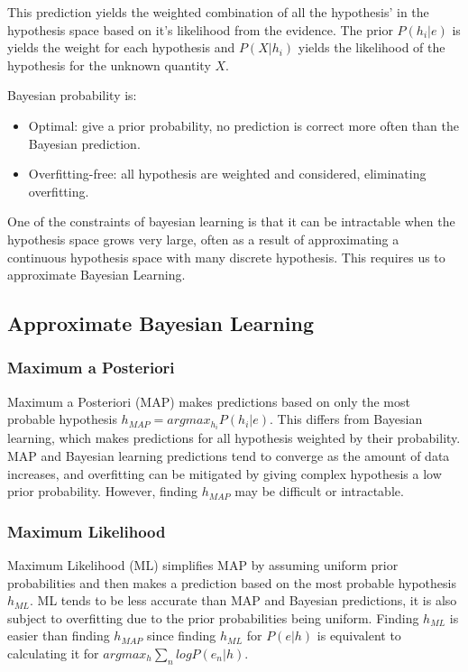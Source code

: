 \documentclass[12pt]{article}
\begin{document}
    This prediction yields the weighted combination of all the hypothesis' in the hypothesis space based on it's likelihood from the evidence. The prior $P(h_i | e)$ is yields the weight for each hypothesis and $P(X|h_i)$ yields the likelihood
    of the hypothesis for the unknown quantity $X$.

    Bayesian probability is:
    \begin{itemize}
        \item Optimal: give a prior probability, no prediction is correct more often than the Bayesian prediction.
        \item Overfitting-free: all hypothesis are weighted and considered, eliminating overfitting.
    \end{itemize}

    One of the constraints of bayesian learning is that it can be intractable when the hypothesis space grows very large, often as a result of approximating a continuous hypothesis space with many discrete hypothesis. This requires us to approximate 
    Bayesian Learning.

    \subsection{Approximate Bayesian Learning}
    \subsubsection{Maximum a Posteriori}
        Maximum a Posteriori (MAP) makes predictions based on only the most probable hypothesis $h_{MAP} = argmax_{h_i}P(h_i | e)$. This differs from Bayesian learning, which makes predictions for all hypothesis weighted by their probability. 
        MAP and Bayesian learning predictions tend to converge as the amount of data increases, and overfitting can be mitigated by giving complex hypothesis a low prior probability. However, finding $h_{MAP}$ may be difficult or intractable.

    \subsubsection{Maximum Likelihood}
        Maximum Likelihood (ML) simplifies MAP by assuming uniform prior probabilities and then makes a prediction based on the most probable hypothesis $h_{ML}$. ML tends to be less accurate than MAP and Bayesian predictions, it is also subject to overfitting
        due to the prior probabilities being uniform. Finding $h_{ML}$ is easier than finding $h_{MAP}$ since finding $h_{ML}$ for $P(e|h)$ is equivalent to calculating it for $argmax_h \sum_n logP(e_n |h)$.
\end{document}
